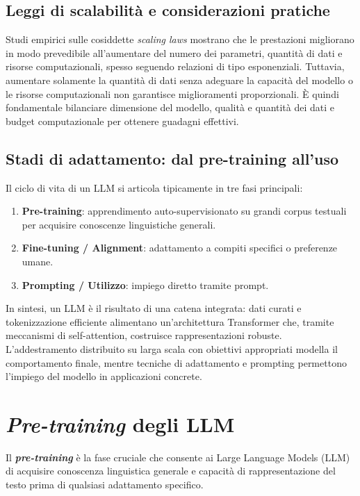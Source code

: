 \subsection{Leggi di scalabilità e considerazioni pratiche}
Studi empirici sulle cosiddette \emph{scaling laws} mostrano che le prestazioni migliorano in modo prevedibile all'aumentare del numero dei parametri, 
quantità di dati e risorse computazionali, spesso seguendo relazioni di tipo esponenziali. Tuttavia, aumentare solamente la quantità di dati 
senza adeguare la capacità del modello o le risorse computazionali non garantisce miglioramenti proporzionali. È quindi fondamentale bilanciare dimensione del modello, 
qualità e quantità dei dati e budget computazionale per ottenere guadagni effettivi.

\subsection{Stadi di adattamento: dal pre-training all'uso}
Il ciclo di vita di un LLM si articola tipicamente in tre fasi principali:
\begin{enumerate}
    \item \textbf{Pre-training}: apprendimento auto-supervisionato su grandi corpus testuali per acquisire conoscenze linguistiche generali.
    \item \textbf{Fine-tuning / Alignment}: adattamento a compiti specifici o preferenze umane.
    \item \textbf{Prompting / Utilizzo}: impiego diretto tramite prompt.
\end{enumerate}

In sintesi, un LLM è il risultato di una catena integrata: dati curati e tokenizzazione efficiente alimentano un'architettura Transformer che, 
tramite meccanismi di self-attention, costruisce rappresentazioni robuste. L'addestramento distribuito su larga scala con obiettivi appropriati 
modella il comportamento finale, mentre tecniche di adattamento e prompting permettono l'impiego del modello in applicazioni concrete.

\newpage
\section{\textit{Pre-training} degli LLM}

Il \textbf{\textit{pre-training}} è la fase cruciale che consente ai Large Language Models (LLM) di acquisire conoscenza linguistica generale e capacità di 
rappresentazione del testo prima di qualsiasi adattamento specifico.

